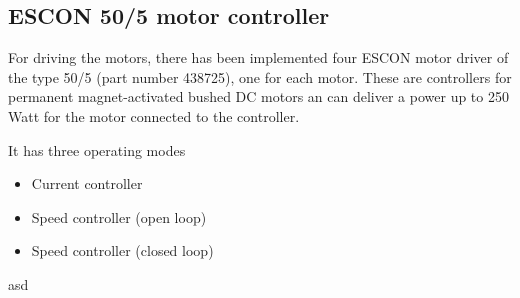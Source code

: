 \subsection{ESCON 50/5 motor controller}
For driving the motors, there has been implemented four ESCON motor driver of the type 50/5 (part number 438725)\cite{ESCON_motor_controller}, one for each motor. These are controllers for permanent magnet-activated bushed DC motors an can deliver a power up to 250 Watt for the motor connected to the controller. 

It has three operating modes

\begin{itemize}
\item Current controller
\item Speed controller (open loop)
\item Speed controller (closed loop)
\end{itemize}

asd







